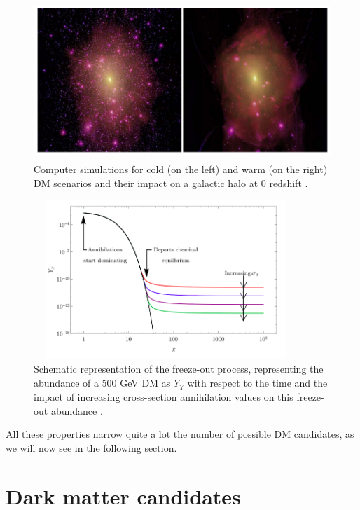 \documentclass[a4paper, 10pt, openright]{report}
\begin{document}
\begin{figure}[htbp]
\begin{center}
\includegraphics[width=14cm, height=6cm]{figs/ColdWarmDM.png}
\caption{Computer simulations for cold (on the left) and warm (on the right) \ac{DM} scenarios and their impact on a galactic halo at 0 redshift \cite{ColdWarmDM}.}
\label{figure:ColdWarmDM}
\end{center}
\end{figure}

\begin{figure}[htbp]
\begin{center}
\includegraphics[width=10cm, height=6cm]{figs/FreezeOut.png}
\caption{Schematic representation of the freeze-out process, representing the abundance of a 500 GeV \ac{DM} as $Y_\chi$ with respect to the time and the impact of increasing cross-section annihilation values on this freeze-out abundance \cite{FreezeOut2}.}
\label{figure:FreezeOut}
\end{center}
\end{figure}

All these properties narrow quite a lot the number of possible \ac{DM} candidates, as we will now see in the following section.

\section{Dark matter candidates} \label{section:DMCandidates}
\end{document}
